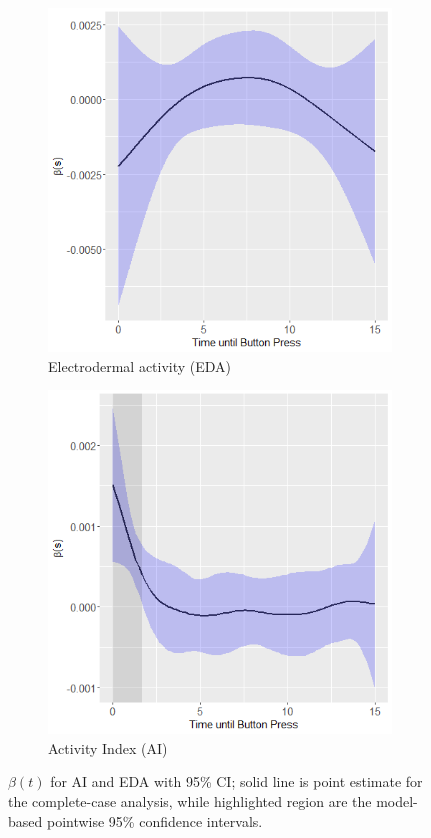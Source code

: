 \documentclass[12pt]{amsart}
\begin{document}
 \begin{figure}[!th]
\centering
\begin{subfigure}{.5\textwidth}
  \centering
  \includegraphics[width=.8\linewidth]{../figures/eda_coef_joint_bootstrap_Delta_15.png}
  \caption{Electrodermal activity (EDA)}
  \label{fig:eda_estimate}
\end{subfigure}%
\begin{subfigure}{.5\textwidth}
  \centering
  \includegraphics[width=.8\linewidth]{../figures/acc_coef_joint_bootstrap_Delta_15.png}
  \caption{Activity Index (AI)
}  \label{fig:acc_estimate}
\end{subfigure}
\caption{$\beta (t)$ for AI and EDA with 95\% CI; solid line is point estimate for the complete-case analysis, while highlighted region are the model-based pointwise 95\% confidence intervals.}
\label{fig:edacc_estimate}
\end{figure}
\end{document}
